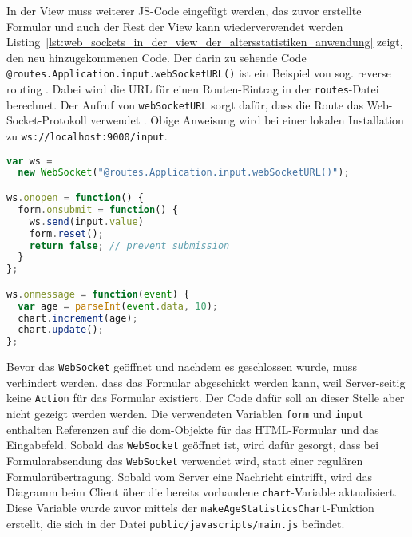 In der View muss weiterer JS-Code eingefügt werden, das zuvor erstellte Formular und auch der Rest der View kann wiederverwendet werden
Listing~\ref{lst:web_sockets_in_der_view_der_altersstatistiken_anwendung} zeigt, den neu hinzugekommenen Code.
Der darin zu sehende Code \lstinline|@routes.Application.input.webSocketURL()| ist ein Beispiel von sog. reverse routing \cite[vgl.][S.~98]{play_for_scala}.
Dabei wird die URL für einen Routen-Eintrag in der \lstinline|routes|-Datei berechnet.
Der Aufruf von \lstinline|webSocketURL| sorgt dafür, dass die Route das Web-Socket-Protokoll verwendet \cite[vgl.][S.~281]{play_for_scala}.
Obige Anweisung wird bei einer lokalen Installation zu \lstinline[language=sh]|ws://localhost:9000/input|.

\begin{lstlisting}[language=javascript, caption=Web-Sockets in der View der Altersstatistiken-Anwendung, label=lst:web_sockets_in_der_view_der_altersstatistiken_anwendung]
var ws =
  new WebSocket("@routes.Application.input.webSocketURL()");

ws.onopen = function() {
  form.onsubmit = function() {
    ws.send(input.value)
    form.reset();
    return false; // prevent submission
  }
};

ws.onmessage = function(event) {
  var age = parseInt(event.data, 10);
  chart.increment(age);
  chart.update();
};
\end{lstlisting}

Bevor das \lstinline|WebSocket| geöffnet und nachdem es geschlossen wurde, muss verhindert werden, dass das Formular abgeschickt werden kann, weil Server-seitig keine \lstinline|Action| für das Formular existiert.
Der Code dafür soll an dieser Stelle aber nicht gezeigt werden werden.
Die verwendeten Variablen \lstinline|form| und \lstinline|input| enthalten Referenzen auf die \gls{dom}-Objekte für das HTML-Formular und das Eingabefeld.
Sobald das \lstinline|WebSocket| geöffnet ist, wird dafür gesorgt, dass bei Formularabsendung das \lstinline|WebSocket| verwendet wird, statt einer regulären Formularübertragung.
Sobald vom Server eine Nachricht eintrifft, wird das Diagramm beim Client über die bereits vorhandene \lstinline|chart|-Variable aktualisiert.
Diese Variable wurde zuvor mittels der \lstinline|makeAgeStatisticsChart|-Funktion erstellt, die sich in der Datei \lstinline|public/javascripts/main.js| befindet.


